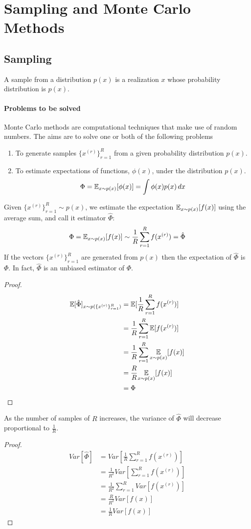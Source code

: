 \documentclass[11pt]{article}
\begin{document}
\section{Sampling and Monte Carlo Methods}
\subsection{Sampling}
A sample from a distribution $p(x)$ is a  realization $x$ whose probability distribution is $p(x)$.

\paragraph{Problems to be solved}
Monte Carlo methods are computational techniques that make use of random numbers. The aims are to solve one or both of the following problems
\begin{enumerate}
	\item To generate samples $\{x^{(r)}\}_{r=1}^R$ from a given probability distribution $p(x)$.
	\item To estimate expectations of functions, $\phi(x)$, under the distribution $p(x)$.
	$$\Phi = \mathbb{E}_{x \sim p(x)}[\phi(x)] = \int \phi(x)p(x) \, dx$$
\end{enumerate}

Given $\{x^{(r)}\}_{r=1}^R \sim p(x)$, we estimate the expectation $\mathbb{E}_{x\sim p(x)}[f(x)]$ using the average sum, and call it estimator $\hat{\Phi}$:
$$\Phi = \mathbb{E}_{x\sim p(x)}[f(x)] \sim \frac{1}{R}\sum_{r=1}^R f(x^{(r)}) = \hat{\Phi}$$
\property
If the vectors $\{x^{(r)}\}_{r=1}^R$ are generated from $p(x)$ then the expectation of $\hat{\Phi}$ is $\Phi$. In fact, $\hat{\Phi}$ is an unbiased estimator of $\Phi$.
\begin{proof}
\begin{align*}
	\mathbb{E}[{\hat{\Phi}}]_{x\sim p(\{x^{(r)}\}_{r=1}^R)} &= \mathbb{E}[{\frac{1}{R}\sum_{r=1}^R f(x^{(r)})}]\\
	&= \frac{1}{R}\sum_{r=1}^R \mathbb{E}[{f(x^{(r)})}] \\
	&= \frac{1}{R} \sum_{r=1}^R \underset{x \sim p(x)}{\mathbb{E}}[f(x)]\\
	&= \frac{R}{R}  \underset{x \sim p(x)}{\mathbb{E}}[f(x)]\\
	&= \Phi
\end{align*}
\end{proof}
\property
As the number of samples of $R$ increases, the variance of $\hat{\Phi}$ will decrease proportional to $\frac{1}{R}$.
\begin{proof}
	\begin{align*}
		Var[\hat{\Phi}] &= Var\left[\frac{1}{R} \sum_{r=1}^R f(x^{(r)})\right] \\
		&= \frac{1}{R^2}Var\left[\sum_{r=1}^R f(x^{(r)})\right]\\
		&= \frac{1}{R^2}\sum_{r=1}^R Var\left[ f(x^{(r)}) \right] \tag{by i.i.d. assumption}\\
		&= \frac{R}{R^2} Var[f(x)] \\
		&= \frac{1}{R} Var[f(x)]
	\end{align*}
\end{proof} 
\end{document}
